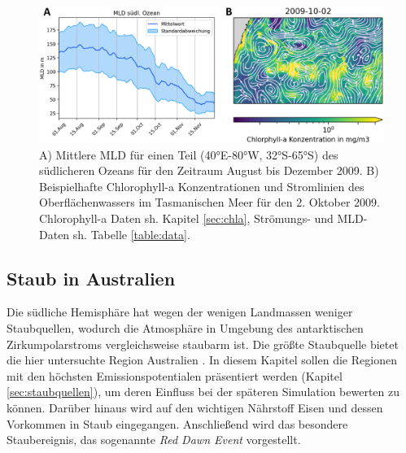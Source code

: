 \documentclass[12pt,a4paper,onecolumn,headheight=30pt]{scrartcl}
\begin{document}
\begin{figure}[htbp]
\includegraphics[width=\textwidth]{bilder/mld_currents.png}
\caption{A) Mittlere MLD für einen Teil (40°E-80°W, 32°S-65°S) des südlicheren Ozeans für den Zeitraum August bis Dezember 2009. B) Beispielhafte Chlorophyll-a Konzentrationen und Stromlinien des Oberflächenwassers im Tasmanischen Meer für den 2. Oktober 2009. Chlorophyll-a Daten sh. Kapitel \ref{sec:chla}, Strömungs- und MLD-Daten sh. Tabelle \ref{table:data}.} \label{fig:mld_currents}
\end{figure}
\subsection{Staub in Australien} \label{sec:Staub}
Die südliche Hemisphäre hat wegen der wenigen Landmassen weniger Staubquellen, wodurch die Atmosphäre in Umgebung des antarktischen Zirkumpolarstroms vergleichsweise staubarm ist. Die größte Staubquelle bietet die hier untersuchte Region Australien \citep{Shao.2011}. In diesem Kapitel sollen die Regionen mit den höchsten Emissionspotentialen präsentiert werden (Kapitel \ref{sec:staubquellen}), um deren Einfluss bei der späteren Simulation bewerten zu können. Darüber hinaus wird auf den wichtigen Nährstoff Eisen und dessen Vorkommen in Staub eingegangen. Anschließend wird das besondere Staubereignis, das sogenannte \textit{Red Dawn Event} vorgestellt.
\end{document}
